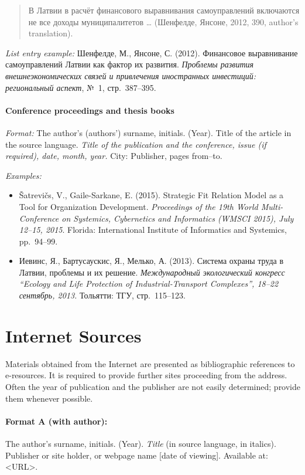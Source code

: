\begin{quote}
В Латвии в расчёт финансового выравнивания самоуправлений включаются не все доходы муниципалитетов \dots{} (Шенфелде, Янсоне, 2012, 390, author's translation).
\end{quote}

\emph{List entry example:} Шенфелде, М., Янсоне, С. (2012). Финансовое выравнивание самоуправлений Латвии как фактор их развития. \emph{Проблемы развития внешнеэкономических связей и привлечения иностранных инвестиций: региональный аспект}, №~1, стр.~387--395.

\paragraph{Conference proceedings and thesis books}

\emph{Format:} The author's (authors') surname, initials. (Year). Title of the article in the source language. \emph{Title of the publication and the conference, issue (if required), date, month, year.} City: Publisher, pages from--to.

\emph{Examples:}
\begin{itemize}
  \item Šatrevičs, V., Gaile-Sarkane, E. (2015). Strategic Fit Relation Model as a Tool for Organization Development. \emph{Proceedings of the 19th World Multi-Conference on Systemics, Cybernetics and Informatics (WMSCI 2015), July 12--15, 2015}. Florida: International Institute of Informatics and Systemics, pp.~94--99.
  \item Иевинс, Я., Бартусаускис, Я., Мелько, А. (2013). Система охраны труда в Латвии, проблемы и их решение. \emph{Международный экологический конгресс ``Ecology and Life Protection of Industrial-Transport Complexes'', 18--22 сентябрь, 2013.} Тольятти: ТГУ, стр.~115--123.
\end{itemize}

\section{Internet Sources}

Materials obtained from the Internet are presented as bibliographic references to e-resources. It is required to provide further sites proceeding from the address. Often the year of publication and the publisher are not easily determined; provide them whenever possible.

\paragraph{Format A (with author):} The author's surname, initials. (Year). \emph{Title} (in source language, in italics). Publisher or site holder, or webpage name [date of viewing]. Available at: \textless URL\textgreater.

